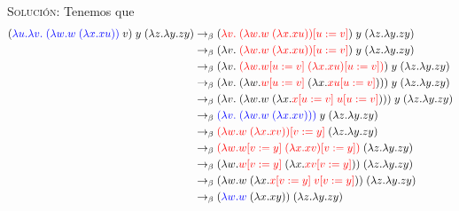 \documentclass[letterpaper,11pt]{article}
\begin{document}
\begin{enumerate}
\begin{enumerate}
        \textsc{Solución:} Tenemos que 
        \begin{align*}
            (\textcolor{blue}{\lambda u. \lambda v. \; (\lambda w.w \; 
                                                       (\lambda x.xu))} \; v) 
            \; y \; (\lambda z. \lambda y.zy)
            &\rightarrow_{\beta}
            (\textcolor{red}{\lambda v. \; (\lambda w.w \; (\lambda x.xu))
                             [u := v]}) \; y \; (\lambda z. \lambda y.zy) \\
            &\rightarrow_{\beta}
            (\lambda v. \; \textcolor{red}{(\lambda w.w \; (\lambda x.xu))
            [u := v]}) \; y \; (\lambda z. \lambda y.zy) \\
            &\rightarrow_{\beta} 
            (\lambda v. \; \textcolor{red}{(\lambda w.w [u := v] \; 
            (\lambda x.xu) [u := v])}) \; y \; (\lambda z. \lambda y.zy) \\
            &\rightarrow_{\beta} 
            (\lambda v. \; (\lambda w. \textcolor{red}{w [u := v]} \;
            (\lambda x. \textcolor{red}{xu [u := v]}))) \; y \; 
            (\lambda z. \lambda y.zy) \\
            &\rightarrow_{\beta}
            (\lambda v. \; (\lambda w.w \; (\lambda x. 
            \textcolor{red}{x[u := v] \; u[u := v]}))) \; y \; 
            (\lambda z. \lambda y.zy) \\
            &\rightarrow_{\beta}
            \textcolor{blue}{(\lambda v. \; (\lambda w.w \; (\lambda x.xv)))}
            \; y \; (\lambda z. \lambda y.zy) \\
            &\rightarrow_{\beta}
            \textcolor{red}{(\lambda w.w \; (\lambda x.xv)) [v := y]}
            \; (\lambda z. \lambda y.zy) \\
            &\rightarrow_{\beta}
            \textcolor{red}{(\lambda w.w [v := y] \; (\lambda x.xv) [v := y])}
            \; (\lambda z. \lambda y.zy) \\
            &\rightarrow_{\beta}
            (\lambda w. \textcolor{red}{w [v := y]} \; (\lambda x.
            \textcolor{red}{xv [v := y]})) \; (\lambda z. \lambda y.zy) \\
            &\rightarrow_{\beta}
            (\lambda w.w \; (\lambda x. 
            \textcolor{red}{x [v := y] \; v [v := y]}))
            \; (\lambda z. \lambda y.zy) \\
            &\rightarrow_{\beta}
            (\textcolor{blue}{\lambda w.w} \; (\lambda x.xy))
            \; (\lambda z. \lambda y.zy) \\

\end{align*}
\end{enumerate}
\end{enumerate}
\end{document}
